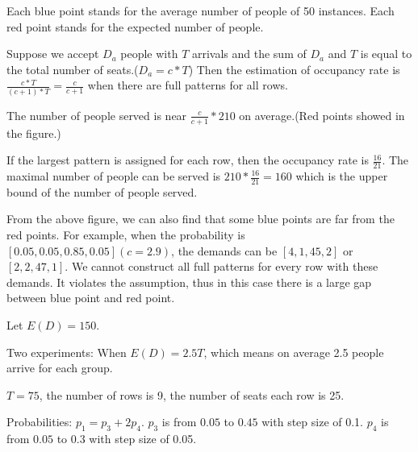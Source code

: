 Each blue point stands for the average number of people of 50 instances.
Each red point stands for the expected number of people.

Suppose we accept $D_a$ people with $T$ arrivals and the sum of $D_a$ and $T$ is equal to the total number of seats.($D_a = c * T$) Then the estimation of occupancy rate is $\frac{c * T}{(c+1) * T}= \frac{c}{c+1}$ when there are full patterns for all rows.


The number of people served is near $\frac{c}{c+1} * 210$ on average.(Red points showed in the figure.) 

If the largest pattern is assigned for each row, then the occupancy rate is $\frac{16}{21}$. The maximal number of people can be served is $210 * \frac{16}{21} =160$ which is the upper bound of the number of people served.

From the above figure, we can also find that some blue points are far from the red points. For example, when the probability is $[0.05, 0.05, 0.85, 0.05](c =2.9)$, the demands can be $[4, 1, 45, 2]$ or $[2, 2, 47, 1]$. We cannot construct all full patterns for every row with these demands. It violates the assumption, thus in this case there is a large gap between blue point and red point.






\newpage

Let $E(D) = 150$.

Two experiments:
When $E(D) = 2.5T$, which means on average 2.5 people arrive for each group.

$T =75$, the number of rows is 9, the number of seats each row is 25.

Probabilities: 
$p_1 = p_3 + 2p_4$. $p_3$ is from $0.05$ to $0.45$ with step size of 0.1. $p_4$ is from $0.05$ to $0.3$ with step size of 0.05.


% 

